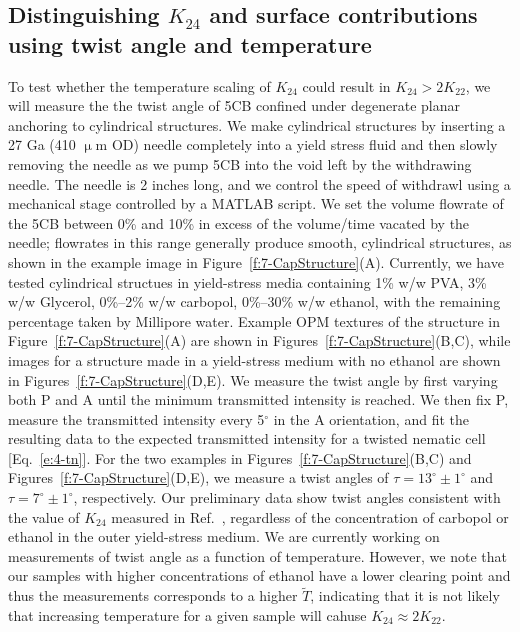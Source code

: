 \subsection{Distinguishing $K_{24}$ and surface contributions using twist angle and temperature}
To test whether the temperature scaling of $K_{24}$ could result in $K_{24} > 2 K_{22}$, we will measure the the twist angle of 5CB confined under degenerate planar anchoring to cylindrical structures.
We make cylindrical structures by inserting a 27 Ga (410  $\upmu$m OD) needle completely into a yield stress fluid and then slowly removing the needle as we pump 5CB into the void left by the withdrawing needle.
The needle is 2 inches long, and we control the speed of withdrawl using a mechanical stage controlled by a MATLAB script.
We set the volume flowrate of the 5CB between 0\% and 10\% in excess of the volume/time vacated by the needle; flowrates in this range generally produce smooth, cylindrical structures, as shown in the example image in Figure~\ref{f:7-CapStructure}(A).
Currently, we have tested cylindrical structues in yield-stress media containing 1\% w/w PVA, 3\% w/w Glycerol, 0\%--2\% w/w carbopol, 0\%--30\% w/w ethanol, with the remaining percentage taken by Millipore water.
Example OPM textures of the structure in Figure~\ref{f:7-CapStructure}(A) are shown in Figures~\ref{f:7-CapStructure}(B,C), while images for a structure made in a yield-stress medium with no ethanol are shown in Figures~\ref{f:7-CapStructure}(D,E).
We measure the twist angle by first varying both P and A until the minimum transmitted intensity is reached.
We then fix P, measure the transmitted intensity every 5$^\circ$ in the A orientation, and fit the resulting data to the expected transmitted intensity for a twisted nematic cell [Eq.~\ref{e:4-tn}].
For the two examples in Figures~\ref{f:7-CapStructure}(B,C) and Figures~\ref{f:7-CapStructure}(D,E), we measure a twist angles of $\tau = 13^{\circ} \pm 1^{\circ}$ and $\tau = 7^{\circ} \pm 1^{\circ}$, respectively.
Our preliminary data show twist angles consistent with the value of $K_{24}$ measured in Ref.~\cite{RN24}, regardless of the concentration of carbopol or ethanol in the outer yield-stress medium.
We are currently working on measurements of twist angle as a function of temperature.
However, we note that our samples with higher concentrations of ethanol have a lower clearing point and thus the measurements corresponds to a higher $\tilde{T}$, indicating that it is not likely that increasing temperature for a given sample will cahuse $K_{24} \approx 2 K_{22}$.
